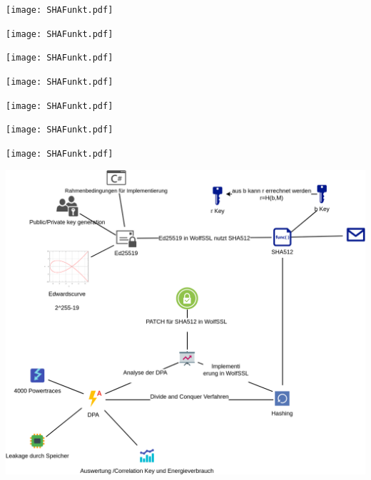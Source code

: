 \documentclass[
  10pt,
  ignorenonframetext,
  aspectratio=43,
]{beamer}
\begin{document}
\begin{frame}{}
\protect\hypertarget{section-14}{}
\texttt{[image: SHAFunkt.pdf]}
\end{frame}

\begin{frame}{}
\protect\hypertarget{section-15}{}
\texttt{[image: SHAFunkt.pdf]}
\end{frame}

\begin{frame}{}
\protect\hypertarget{section-16}{}
\texttt{[image: SHAFunkt.pdf]}
\end{frame}

\begin{frame}{}
\protect\hypertarget{section-17}{}
\texttt{[image: SHAFunkt.pdf]}
\end{frame}

\begin{frame}{}
\protect\hypertarget{section-18}{}
\texttt{[image: SHAFunkt.pdf]}
\end{frame}

\begin{frame}{}
\protect\hypertarget{section-19}{}
\texttt{[image: SHAFunkt.pdf]}
\end{frame}

\begin{frame}{}
\protect\hypertarget{section-20}{}
\texttt{[image: SHAFunkt.pdf]}
\end{frame}

\begin{frame}{}
\protect\hypertarget{section-21}{}
\includegraphics{Abbildungen/ITSEC(1)_res.png}
\end{frame}
\end{document}
